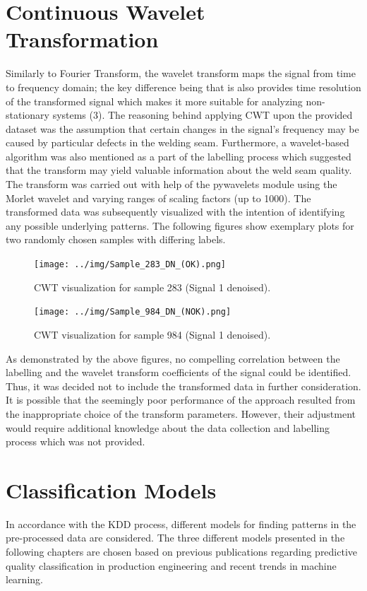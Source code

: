 \documentclass[12pt]{report}
\begin{document}
\section{Continuous Wavelet Transformation}
Similarly to Fourier Transform, the wavelet transform maps the signal from time to frequency domain; the key difference being that is also provides time resolution of the transformed signal which makes it more suitable for analyzing non-stationary systems (3). The reasoning behind applying CWT upon the provided dataset was the assumption that certain changes in the signal’s frequency may be caused by particular defects in the welding seam. Furthermore, a wavelet-based algorithm was also mentioned as a part of the labelling process which suggested that the transform may yield valuable information about the weld seam quality.
The transform was carried out with help of the pywavelets module using the Morlet wavelet and varying ranges of scaling factors (up to 1000). The transformed data was subsequently visualized with the intention of identifying any possible underlying patterns. The following figures show exemplary plots for two randomly chosen samples with differing labels.
\begin{figure}[H]
	\centering
	\texttt{[image: ../img/Sample\_283\_DN\_(OK).png]}
	\caption{CWT visualization for sample 283 (Signal 1 denoised).}
	\label{fig:CWT1}
\end{figure}
\begin{figure}[H]
	\centering
	\texttt{[image: ../img/Sample\_984\_DN\_(NOK).png]}
	\caption{CWT visualization for sample 984 (Signal 1 denoised).}
	\label{fig:CW2}
\end{figure}
As demonstrated by the above figures, no compelling correlation between the labelling and the wavelet transform coefficients of the signal could be identified. Thus, it was decided not to include the transformed data in further consideration. It is possible that the seemingly poor performance of the approach resulted from the inappropriate choice of the transform parameters. However, their adjustment would require additional knowledge about the data collection and labelling process which was not provided.


\section{Classification Models} 
In accordance with the KDD process, different models for finding patterns in the pre-processed data are considered.  The three different models presented in the following chapters are chosen based on previous publications regarding predictive quality classification in production engineering and recent trends in machine learning.
\end{document}
